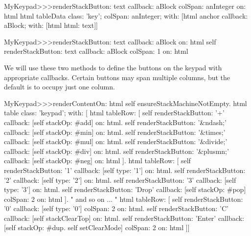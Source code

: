 \documentclass[a4paper,10pt,twoside]{book}
\begin{document}

\begin{code}{}
MyKeypad>>>renderStackButton: text callback: aBlock colSpan: anInteger on: html 
	html tableData
		class: 'key';
		colSpan: anInteger;
		with: 
				[html anchor
					callback: aBlock;
					with: [html html: text]]
\end{code}


\begin{code}{}
MyKeypad>>>renderStackButton: text callback: aBlock on: html 
	self 
		renderStackButton: text
		callback: aBlock
		colSpan: 1
		on: html
\end{code}

We will use these two methods to define the buttons on the keypad with appropriate callbacks.
Certain buttons may span multiple columns, but the default is to occupy just one column.


\begin{code}{}
MyKeypad>>>renderContentOn: html 
  self ensureStackMachineNotEmpty.
  html table
    class: 'keypad';
    with: [
      html tableRow: [
          self renderStackButton: '+' callback: [self stackOp: #add] on: html.
          self renderStackButton: '&ndash;' callback: [self stackOp: #min] on: html.
          self renderStackButton: '&times;' callback: [self stackOp: #mul] on: html.
          self renderStackButton: '&divide;' callback: [self stackOp: #div] on: html.
          self renderStackButton: '&plusmn;' callback: [self stackOp: #neg] on: html ].
        html tableRow: [
          self renderStackButton: '1' callback: [self type: '1'] on: html.
          self renderStackButton: '2' callback: [self type: '2'] on: html.
          self renderStackButton: '3' callback: [self type: '3'] on: html.
          self renderStackButton: 'Drop' callback: [self stackOp: #pop]
          	colSpan: 2 on: html ].
" and so on ... "
        html tableRow: [
          self renderStackButton: '0' callback: [self type: '0'] colSpan: 2 on: html.
          self renderStackButton: 'C' callback: [self stackClearTop] on: html.
          self renderStackButton: 'Enter'
          	callback: [self stackOp: #dup. self setClearMode]
			colSpan: 2 on: html ]]
\end{code}
\end{document}
